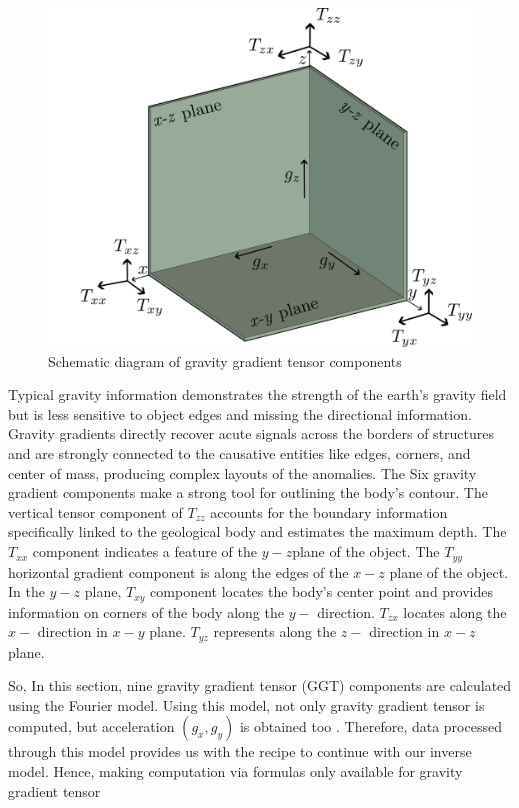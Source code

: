 \documentclass[a4paper,11pt]{article}
\begin{document}
\begin{figure}[ht]
    \centering
    \includegraphics[scale=2.5]{images/coordinate_system.png}
    \caption{Schematic diagram of gravity gradient tensor components }
\end{figure}

\noindent Typical gravity information demonstrates the strength of the earth's gravity field but is less sensitive to object edges and missing the directional information. Gravity gradients directly recover acute signals across the borders of structures and are strongly connected to the causative entities like edges, corners, and center of mass, producing complex layouts of the anomalies. The Six gravity gradient components make a strong tool for outlining the body's contour. The vertical tensor component of $T_{zz}$ accounts for the boundary information specifically linked to the geological body and estimates the maximum depth. The $T_{xx}$ component indicates a feature of the $y-z$plane of the object. The $T_{yy}$ horizontal gradient component is along the edges of the $x-z$ plane of the object. In the $y-z$ plane, $T_{xy}$ component locates the body's center point and provides information on corners of the body along the $y-$ direction. $T_{zx}$ locates along the $x-$ direction in $x-y$ plane. $T_{yz}$ represents along the $z-$ direction in $x-z$ plane.\cite{menoret2018gravity} 

\noindent So, In this section, nine gravity gradient tensor (GGT) components are calculated using the Fourier model. Using this model, not only gravity gradient tensor is computed, but acceleration $(g_{x}, g_{y})$ is obtained too \cite{mickus2001complete}. Therefore, data processed through this model provides us with the recipe to continue with our inverse model. Hence, making computation via formulas only available for gravity gradient tensor\medskip
\end{document}
